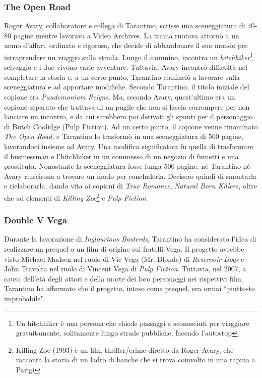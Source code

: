 \documentclass[12pt]{article} %
\begin{document}
\begin{flushleft}
\subsubsection*{The Open Road}
Roger Avary, collaboratore e collega di Tarantino, scrisse una sceneggiatura di 40-80 pagine mentre lavorava a Video Archives. La trama ruotava attorno a un uomo d'affari, ordinato e rigoroso, che decide di abbandonare il suo mondo per intraprendere un viaggio sulla strada. Lungo il cammino, incontra un \textit{hitchhiker}\footnote{Un hitchhiker è una persona che chiede passaggi a sconosciuti per viaggiare gratuitamente, solitamente lungo strade pubbliche, facendo l'autostop} selvaggio e i due vivono varie avventure. Tuttavia, Avary incontrò difficoltà nel completare la storia e, a un certo punto, Tarantino cominciò a lavorare sulla sceneggiatura e ad apportare modifiche. Secondo Tarantino, il titolo iniziale del copione era \textit{Pandemonium Reigns}. Ma, secondo Avary, quest'ultimo era un copione separato che trattava di un pugile che non si lascia corrompere per non lanciare un incontro, e da cui sarebbero poi derivati gli spunti per il personaggio di Butch Coolidge (Pulp Fiction). 
Ad un certo punto, il copione venne rinominato \textit{The Open Road}, e Tarantino lo trasformò in una sceneggiatura di 500 pagine, lavorandoci insieme ad Avary. Una modifica significativa fu quella di trasformare il businessman e l'hitchhiker in un commesso di un negozio di fumetti e una prostituta. Nonostante la sceneggiatura fosse lunga 500 pagine, né Tarantino né Avary riuscirono a trovare un modo per concluderla. Decisero quindi di smontarla e rielaborarla, dando vita ai copioni di \textit{True Romance}, \textit{Natural Born Killers}, oltre che ad elementi di \textit{Killing Zoe}\footnote{Killing Zoe (1993) è un film thriller/crime diretto da Roger Avary, che racconta la storia di un ladro di banche che si trova coinvolto in una rapina a Parigi} e \textit{Pulp Fiction}.
\subsubsection*{Double V Vega}
Durante la lavorazione di \textit{Inglourious Basterds}, Tarantino ha considerato l'idea di realizzare un prequel o un film di origine sui fratelli Vega. Il progetto avrebbe visto Michael Madsen nel ruolo di Vic Vega (Mr. Blonde) di \textit{Reservoir Dogs} e John Travolta nel ruolo di Vincent Vega di \textit{Pulp Fiction}. Tuttavia, nel 2007, a causa dell'età degli attori e della morte dei loro personaggi nei rispettivi film, Tarantino ha affermato che il progetto, inteso come prequel, era ormai ``piuttosto improbabile".

\end{flushleft}
\end{document}
